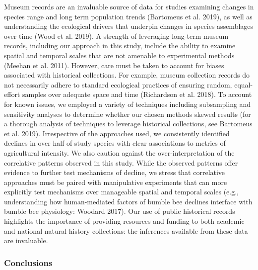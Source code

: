 \documentclass[11pt,]{article}
\begin{document}
Museum records are an invaluable source of data for studies examining
changes in species range and long term population trends (Bartomeus et
al. 2019), as well as understanding the ecological drivers that underpin
changes in species assemblages over time (Wood et al. 2019). A strength
of leveraging long-term museum records, including our approach in this
study, include the ability to examine spatial and temporal scales that
are not amenable to experimental methods (Meehan et al. 2011). However,
care must be taken to account for biases associated with historical
collections. For example, museum collection records do not necessarily
adhere to standard ecological practices of ensuring random, equal-effort
samples over adequate space and time (Richardson et al. 2018). To
account for known issues, we employed a variety of techniques including
subsampling and sensitivity analyses to determine whether our chosen
methods skewed results (for a thorough analysis of techniques to
leverage historical collections, see Bartomeus et al. 2019).
Irrespective of the approaches used, we consistently identified declines
in over half of study species with clear associations to metrics of
agricultural intensity. We also caution against the over-interpretation
of the correlative patterns observed in this study. While the observed
patterns offer evidence to further test mechanisms of decline, we stress
that correlative approaches must be paired with manipulative experiments
that can more explicitly test mechanisms over manageable spatial and
temporal scales (e.g., understanding how human-mediated factors of
bumble bee declines interface with bumble bee physiology: Woodard 2017).
Our use of public historical records highlights the importance of
providing resources and funding to both academic and national natural
history collections: the inferences available from these data are
invaluable.

\hypertarget{conclusions}{%
\subsubsection{Conclusions}\label{conclusions}}
\end{document}
